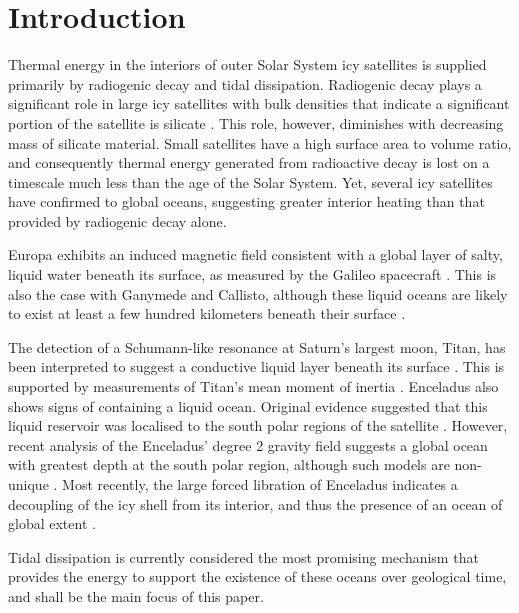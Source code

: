 \newpage
\section{Introduction}


Thermal energy in the interiors of outer Solar System icy satellites is supplied primarily by radiogenic decay and tidal dissipation. Radiogenic decay plays a significant role in large icy satellites with bulk densities that indicate a significant portion of the satellite is silicate \citep{hussmann2006subsurface}. This role, however, diminishes with decreasing mass of silicate material. Small satellites have a high surface area to volume ratio, and consequently thermal energy generated from radioactive decay is lost on a timescale much less than the age of the Solar System. Yet, several icy satellites have confirmed to global oceans, suggesting greater interior heating than that provided by radiogenic decay alone.

Europa exhibits an induced magnetic field consistent with a global layer of salty, liquid water beneath its surface, as measured by the Galileo spacecraft \citep{zimmer2000subsurface, kivelson2000galileo, hand2007empirical}. This is also the case with Ganymede and Callisto, although these liquid oceans are likely to exist at least a few hundred kilometers beneath their surface \citep{zimmer2000subsurface, kivelson2000galileo}. 

The detection of a Schumann-like resonance at Saturn's largest moon, Titan, has been interpreted to suggest a conductive liquid layer beneath its surface \citep{beghin2010titan}. This is supported by measurements of Titan's mean moment of inertia \citep{bills2011rotational}. Enceladus also shows signs of containing a liquid ocean. Original evidence suggested that this liquid reservoir was localised to the south polar regions of the satellite \citep[e.g.,][]{collins2007enceladus}. However, recent analysis of the Enceladus' degree 2 gravity field suggests a global ocean with greatest depth at the south polar region, although such models are non-unique \citep{iess2014gravity,mckinnon2015effect}. Most recently, the large forced libration of Enceladus indicates a decoupling of the icy shell from its interior, and thus the presence of an ocean of global extent \citep{thomas2015enceladus}.  

Tidal dissipation is currently considered the most promising mechanism that provides the energy to support the existence of these oceans over geological time, and shall be the main focus of this paper.

